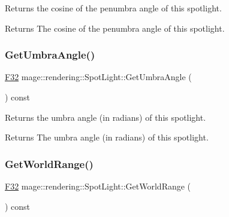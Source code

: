 Returns the cosine of the penumbra angle of this spotlight.

\begin{DoxyReturn}{Returns}
The cosine of the penumbra angle of this spotlight. 
\end{DoxyReturn}
\mbox{\label{classmage_1_1rendering_1_1_spot_light_a2ad4020c60fcfd2fca7568fbefa601f0}} 
\subsubsection{\texorpdfstring{Get\+Umbra\+Angle()}{GetUmbraAngle()}}
{\footnotesize\ttfamily \mbox{\hyperlink{namespacemage_aa97e833b45f06d60a0a9c4fc22ae02c0}{F32}} mage\+::rendering\+::\+Spot\+Light\+::\+Get\+Umbra\+Angle (\begin{DoxyParamCaption}{ }\end{DoxyParamCaption}) const\hspace{0.3cm}{\ttfamily [noexcept]}}

Returns the umbra angle (in radians) of this spotlight.

\begin{DoxyReturn}{Returns}
The umbra angle (in radians) of this spotlight. 
\end{DoxyReturn}
\mbox{\label{classmage_1_1rendering_1_1_spot_light_a13b573af8d6131b6bf426362088a2a56}} 
\subsubsection{\texorpdfstring{Get\+World\+Range()}{GetWorldRange()}}
{\footnotesize\ttfamily \mbox{\hyperlink{namespacemage_aa97e833b45f06d60a0a9c4fc22ae02c0}{F32}} mage\+::rendering\+::\+Spot\+Light\+::\+Get\+World\+Range (\begin{DoxyParamCaption}{ }\end{DoxyParamCaption}) const\hspace{0.3cm}{\ttfamily [noexcept]}}


